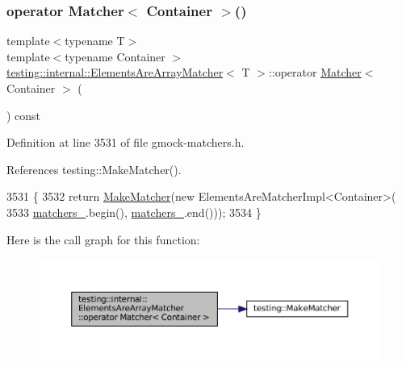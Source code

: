 \mbox{\label{classtesting_1_1internal_1_1ElementsAreArrayMatcher_ac776db6072208f39f3eced25fb353f75}} 
\subsubsection{\texorpdfstring{operator Matcher$<$ Container $>$()}{operator Matcher< Container >()}}
{\footnotesize\ttfamily template$<$typename T$>$ \\
template$<$typename Container $>$ \\
\hyperlink{classtesting_1_1internal_1_1ElementsAreArrayMatcher}{testing\+::internal\+::\+Elements\+Are\+Array\+Matcher}$<$ T $>$\+::operator \hyperlink{classtesting_1_1Matcher}{Matcher}$<$ Container $>$ (\begin{DoxyParamCaption}{ }\end{DoxyParamCaption}) const\hspace{0.3cm}{\ttfamily [inline]}}



Definition at line 3531 of file gmock-\/matchers.\+h.



References testing\+::\+Make\+Matcher().


\begin{DoxyCode}
3531                                       \{
3532     \textcolor{keywordflow}{return} \hyperlink{namespacetesting_a37fd8029ac00e60952440a3d9cca8166}{MakeMatcher}(\textcolor{keyword}{new} ElementsAreMatcherImpl<Container>(
3533         \hyperlink{classtesting_1_1internal_1_1ElementsAreArrayMatcher_af28db07928ad4eb3128d553757ed712c}{matchers\_}.begin(), \hyperlink{classtesting_1_1internal_1_1ElementsAreArrayMatcher_af28db07928ad4eb3128d553757ed712c}{matchers\_}.end()));
3534   \}
\end{DoxyCode}
Here is the call graph for this function\+:
\nopagebreak
\begin{figure}[H]
\begin{center}
\leavevmode
\includegraphics[width=350pt]{classtesting_1_1internal_1_1ElementsAreArrayMatcher_ac776db6072208f39f3eced25fb353f75_cgraph}
\end{center}
\end{figure}


